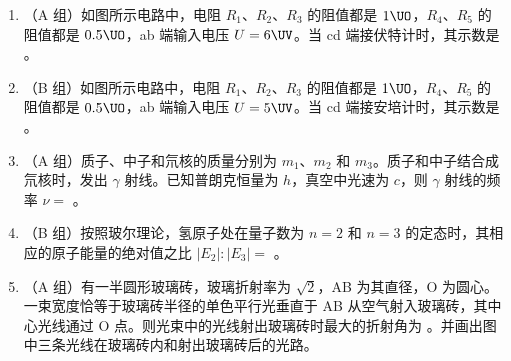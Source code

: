 \documentclass[\gkver]{gaokaozhenti}
\begin{document}
\begin{enumerate}
\item
（A 组）如图所示电路中，电阻 $R_{1}$、$R_{2}$、$R_{3}$ 的阻值都是 $1\UO$，$R_{4}$、$R_{5}$ 的阻值都是 $0.5\UO$，ab 端输入电压 $U = 6\UV$。当 cd 端接伏特计时，其示数是 \tkanswer[1.6cm]{$2\UV$}。
\onepicture[align=right, w=5.88cm]{}
\jdanswer{
$2\UV$
}

\item
（B 组）如图所示电路中，电阻 $R_{1}$、$R_{2}$、$R_{3}$ 的阻值都是 $1\UO$，$R_{4}$、$R_{5}$ 的阻值都是 $0.5\UO$，ab 端输入电压 $U = 5\UV$。当 cd 端接安培计时，其示数是 \tkanswer[1.6cm]{$1\UA$}。
\onepicture[align=right, w=5.88cm]{}
\jdanswer{
$1\UA$
}

\item
（A 组）质子、中子和氘核的质量分别为 $m_{1}$、$m_{2}$ 和 $m_{3}$。质子和中子结合成氘核时，发出 $\gamma$ 射线。已知普朗克恒量为 $h$，真空中光速为 $c$，则 $\gamma$ 射线的频率 $\nu =$ 。

\item
（B 组）按照玻尔理论，氢原子处在量子数为 $n = 2$ 和 $n = 3$ 的定态时，其相应的原子能量的绝对值之比 $|E_{2}|:|E_{3}| =$ 。

\item
（A 组）有一半圆形玻璃砖，玻璃折射率为 $\sqrt{2}$，AB 为其直径，O 为圆心。一束宽度恰等于玻璃砖半径的单色平行光垂直于 AB 从空气射入玻璃砖，其中心光线通过 O 点。则光束中的光线射出玻璃砖时最大的折射角为 。并画出图中三条光线在玻璃砖内和射出玻璃砖后的光路。
\onepicture[align=right, h=4.20cm]{}
\end{enumerate}
\end{document}
